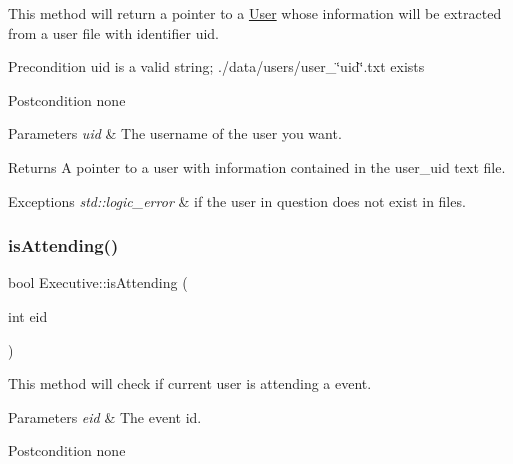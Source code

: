 This method will return a pointer to a \mbox{\hyperlink{class_user}{User}} whose information will be extracted from a user file with identifier uid. \begin{DoxyPrecond}{Precondition}
uid is a valid string; ./data/users/user\+\_\+\char`\"{}uid\char`\"{}.txt exists 
\end{DoxyPrecond}
\begin{DoxyPostcond}{Postcondition}
none 
\end{DoxyPostcond}

\begin{DoxyParams}{Parameters}
{\em uid} & The username of the user you want. \\
\hline
\end{DoxyParams}
\begin{DoxyReturn}{Returns}
A pointer to a user with information contained in the user\+\_\+uid text file. 
\end{DoxyReturn}

\begin{DoxyExceptions}{Exceptions}
{\em std\+::logic\+\_\+error} & if the user in question does not exist in files. \\
\hline
\end{DoxyExceptions}
\mbox{\label{class_executive_a65588e97784c7062ba999b141b683bd0}} 
\subsubsection{\texorpdfstring{is\+Attending()}{isAttending()}}
{\footnotesize\ttfamily bool Executive\+::is\+Attending (\begin{DoxyParamCaption}\item[{int}]{eid }\end{DoxyParamCaption})}

This method will check if current user is attending a event. 
\begin{DoxyParams}{Parameters}
{\em eid} & The event id. \\
\hline
\end{DoxyParams}
\begin{DoxyPostcond}{Postcondition}
none 
\end{DoxyPostcond}
\mbox{\label{class_executive_a13d8530957ee3c54bb355b62005177ed}} 
